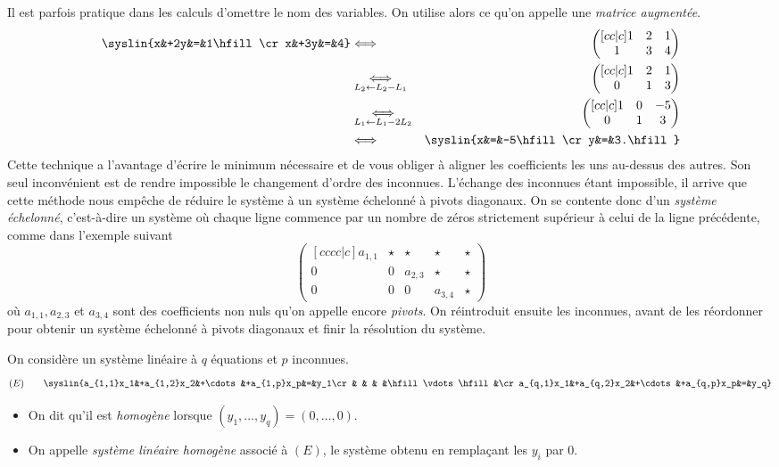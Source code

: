 \documentclass{magnolia}
\begin{document}
\begin{remarques}
\remarque Il est parfois pratique dans les calculs d'omettre le nom des variables. On
  utilise alors ce qu'on appelle une \emph{matrice augmentée}.
\begin{eqnarray*}
\syslin{x&+2y&=&1\hfill\cr
            x&+3y&=&4}
&\ssi& \begin{pmatrix}[cc|c]
  1 & 2 & 1\\
  1 & 3 & 4
\end{pmatrix}\\
&\underset{L_2\gets L_2-L_1}{\ssi}& \begin{pmatrix}[cc|c]
  1 & 2 & 1\\
  0 & 1 & 3 
\end{pmatrix}
\\
&\underset{L_1\gets L_1-2L_2}{\ssi}& \begin{pmatrix}[cc|c]
  1 & 0 & -5\\
  0 & 1 & 3 
\end{pmatrix}
\\
&\ssi& \syslin{x&=&-5\hfill\cr
        y&=&3.\hfill}
\end{eqnarray*}
Cette technique a l'avantage d'écrire le minimum nécessaire et de vous obliger à aligner
les coefficients les uns au-dessus des autres. Son seul inconvénient est de rendre
impossible le changement d'ordre des inconnues.
\remarque L'échange des inconnues étant impossible, il arrive que cette méthode nous 
  empêche de réduire le système à un système échelonné à pivots diagonaux.
  On se contente donc d'un \emph{système échelonné}, c'est-à-dire
  un système où chaque ligne commence par un nombre de zéros strictement supérieur à
  celui de la ligne précédente, comme dans l'exemple suivant
  \[\begin{pmatrix}[cccc|c]
    a_{1,1} & \star &   \star &   \star & \star \\
          0 &     0 & a_{2,3} &   \star & \star \\
          0 &     0 &       0  & a_{3,4} & \star
  \end{pmatrix}\]
  où $a_{1,1}, a_{2,3}$ et $a_{3,4}$ sont des coefficients non nuls qu'on appelle encore
  \emph{pivots}.
  On réintroduit ensuite les inconnues, avant de les réordonner
  pour obtenir un système échelonné à pivots diagonaux et finir la résolution
  du système.
\end{remarques}

\begin{definition}
On considère un système linéaire à $q$ équations et $p$ inconnues.
\[(E) \qquad \syslin{a_{1,1}x_1&+a_{1,2}x_2&+\cdots&+a_{1,p}x_p&=&y_1\cr
                    &          &       &          &\hfill\vdots\hfill&\cr
          a_{q,1}x_1&+a_{q,2}x_2&+\cdots&+a_{q,p}x_p&=&y_q}\]
\begin{itemize}
\item On dit qu'il est \emph{homogène} lorsque $(y_1,\ldots,y_q)=(0,\ldots,0)$.
\item On appelle \emph{système linéaire homogène} associé à $(E)$, le système obtenu en
  remplaçant les $y_i$ par $0$.
\end{itemize}
\end{definition}
\end{document}
